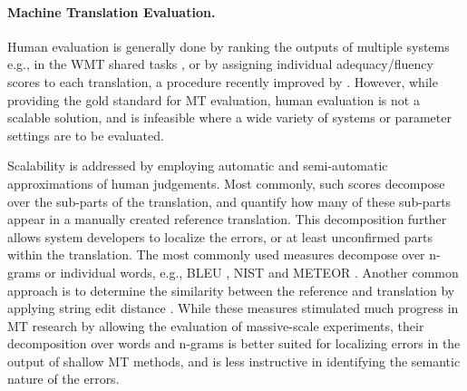 \documentclass[11pt]{article}
\newcommand{\secref}[1]{Section~\ref{#1}}
\begin{document}


\paragraph{Machine Translation Evaluation.}
Human evaluation is generally done by ranking the outputs of multiple systems
e.g., in the WMT shared tasks \cite{bojar2015findings}, or by assigning
individual adequacy/fluency scores to each translation, a procedure recently improved
by .
However, while providing the gold standard for MT evaluation, human evaluation is not a scalable solution,
and is infeasible where a wide variety of systems or parameter settings are to be evaluated.

Scalability is addressed by employing automatic and semi-automatic approximations of human
judgements. Most commonly, such scores decompose over the sub-parts of
the translation, and quantify how many of these sub-parts appear in a manually created reference translation.
This decomposition further allows system developers
to localize the errors, or at least unconfirmed parts within the translation.
The most commonly used measures decompose over n-grams or individual words, e.g., 
BLEU \cite{Papineni:2002}, NIST \cite{Doddington:2002} and METEOR  \cite{Banerjee:2005}.
Another common approach is to determine the similarity between the reference and translation
by applying string edit distance \cite{snover2006study}.
While these measures stimulated much progress in MT research by allowing
the evaluation of massive-scale experiments,
their decomposition over words and n-grams is better suited for localizing errors
in the output of shallow MT methods, and is less instructive in identifying the semantic
nature of the errors. 
\end{document}

